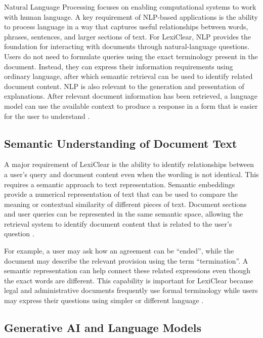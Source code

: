 \documentclass[12pt,a4paper,oneside]{report}
\begin{document}
Natural Language Processing focuses on enabling computational systems to
work with human language. A key requirement of NLP-based applications is the
ability to process language in a way that captures useful relationships
between words, phrases, sentences, and larger sections of text. For LexiClear, NLP provides the foundation for interacting with documents
through natural-language questions. Users do not need to formulate queries
using the exact terminology present in the document. Instead, they can
express their information requirements using ordinary language, after which
semantic retrieval can be used to identify related document content. NLP is also relevant to the generation and presentation of explanations.
After relevant document information has been retrieved, a language model can
use the available context to produce a response in a form that is easier for
the user to understand \cite{bommarito2018lexnlp}.

\subsection{Semantic Understanding of Document Text}

A major requirement of LexiClear is the ability to identify relationships
between a user's query and document content even when the wording is not
identical. This requires a semantic approach to text representation. Semantic embeddings provide a numerical representation of text that can be
used to compare the meaning or contextual similarity of different pieces of
text. Document sections and user queries can be represented in the same
semantic space, allowing the retrieval system to identify document content
that is related to the user's question \cite{reimers2019sbert}.

For example, a user may ask how an agreement can be ``ended'', while the
document may describe the relevant provision using the term
``termination''. A semantic representation can help connect these related
expressions even though the exact words are different. This capability is important for LexiClear because legal and administrative
documents frequently use formal terminology while users may express their
questions using simpler or different language \cite{reimers2019sbert}.

\subsection{Generative AI and Language Models}
\end{document}
